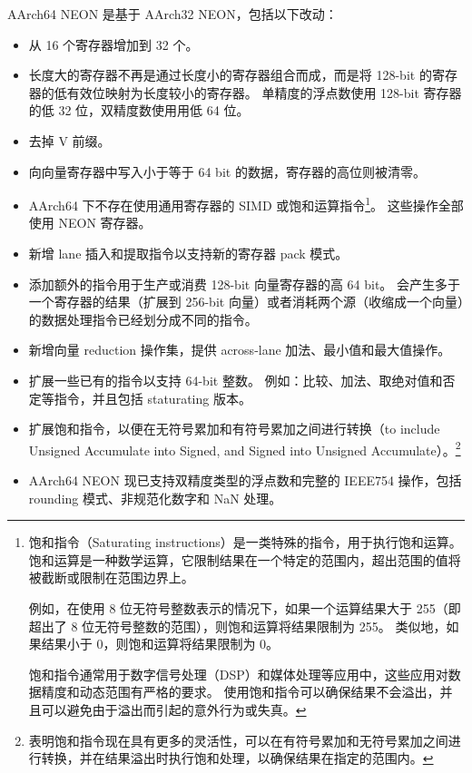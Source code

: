 
AArch64 NEON 是基于 AArch32 NEON，包括以下改动：
\begin{itemize}
  \item 从 16 个寄存器增加到 32 个。
  \item 长度大的寄存器不再是通过长度小的寄存器组合而成，而是将 128-bit 的寄存器的低有效位映射为长度较小的寄存器。
    单精度的浮点数使用 128-bit 寄存器的低 32 位，双精度数使用用低 64 位。
  \item 去掉 V 前缀。
  \item 向向量寄存器中写入小于等于 64 bit 的数据，寄存器的高位则被清零。
  \item AArch64 下不存在使用通用寄存器的 SIMD 或饱和运算指令\footnote{
      饱和指令（Saturating instructions）是一类特殊的指令，用于执行饱和运算。
      饱和运算是一种数学运算，它限制结果在一个特定的范围内，超出范围的值将被截断或限制在范围边界上。

      例如，在使用 8 位无符号整数表示的情况下，如果一个运算结果大于 255（即超出了 8 位无符号整数的范围），则饱和运算将结果限制为 255。
      类似地，如果结果小于 0，则饱和运算将结果限制为 0。

      饱和指令通常用于数字信号处理（DSP）和媒体处理等应用中，这些应用对数据精度和动态范围有严格的要求。
      使用饱和指令可以确保结果不会溢出，并且可以避免由于溢出而引起的意外行为或失真。
    }。
    这些操作全部使用 NEON 寄存器。
  \item 新增 lane 插入和提取指令以支持新的寄存器 pack 模式。
  \item 添加额外的指令用于生产或消费 128-bit 向量寄存器的高 64 bit。
    会产生多于一个寄存器的结果（扩展到 256-bit 向量）或者消耗两个源（收缩成一个向量）的数据处理指令已经划分成不同的指令。
  \item 新增向量 reduction 操作集，提供 across-lane 加法、最小值和最大值操作。
  \item 扩展一些已有的指令以支持 64-bit 整数。
    例如：比较、加法、取绝对值和否定等指令，并且包括 staturating 版本。
  \item 扩展饱和指令，以便在无符号累加和有符号累加之间进行转换（to include Unsigned Accumulate into Signed, and Signed into Unsigned Accumulate）。\footnote{
      表明饱和指令现在具有更多的灵活性，可以在有符号累加和无符号累加之间进行转换，并在结果溢出时执行饱和处理，以确保结果在指定的范围内。
    }
  \item AArch64 NEON 现已支持双精度类型的浮点数和完整的 IEEE754 操作，包括 rounding 模式、非规范化数字和 NaN 处理。
\end{itemize}

